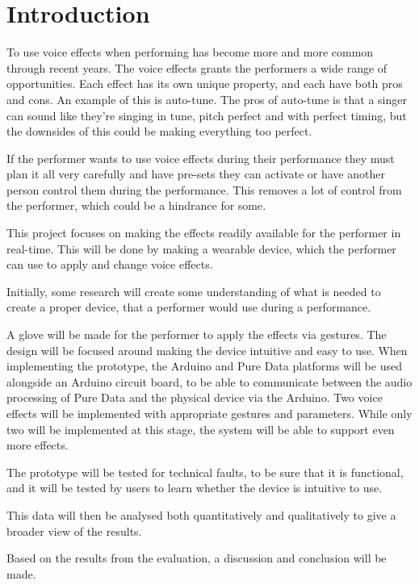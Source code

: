 \chapter{Introduction}\label{ch:Intro}

To use voice effects when performing has become more and more common through recent years. The voice effects grants the performers a wide range of opportunities. Each effect has its own unique property, and each have both pros and cons. An example of this is auto-tune.
The pros of auto-tune is that a singer can sound like they're singing in tune, pitch perfect and with perfect timing, but the downsides of this could be making everything too perfect\citep{Tyrangiel_2009}.

If the performer wants to use voice effects during their performance they must plan it all very carefully and have pre-sets they can activate or have another person control them during the performance. This removes a lot of control from the performer, which could be a hindrance for some.

This project focuses on making the effects readily available for the performer in real-time. This will be done by making a wearable device, which the performer can use to apply and change voice effects.

Initially, some research will create some understanding of what is needed to create a proper device, that a performer would use during a performance.

A glove will be made for the performer to apply the effects via gestures. The design will be focused around making the device intuitive and easy to use.
When implementing the prototype, the Arduino and Pure Data platforms will be used alongside an Arduino circuit board, to be able to communicate between the audio processing of Pure Data and the physical device via the Arduino.
Two voice effects will be implemented with appropriate gestures and parameters. While only two will be implemented at this stage, the system will be able to support even more effects.

The prototype will be tested for technical faults, to be sure that it is functional, and it will be tested by users to learn whether the device is intuitive to use.

This data will then be analysed both quantitatively and qualitatively to give a broader view of the results. 

Based on the results from the evaluation, a discussion and conclusion will be made.


